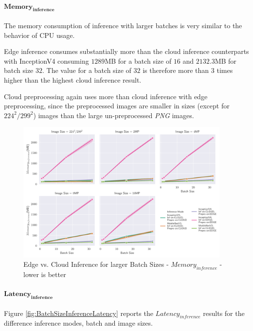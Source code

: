 \paragraph{$\mathbf{Memory_{inference}}$}
The memory consumption of inference with larger batches is very similar to the behavior of CPU usage.


Edge inference consumes substantially more than the cloud inference counterparts with InceptionV4 consuming $1289$MB for a batch size of $16$ and $2132.3$MB for batch size $32$.
The value for a batch size of $32$ is therefore more than $3$ times higher than the highest cloud inference result.

Cloud preprocessing again uses more than cloud inference with edge preprocessing, since the preprocessed images are smaller in sizes (except for $224^2/299^2$) images than the large un-preprocessed \emph{PNG} images.




\begin{figure}[!htb]
\centering
\includegraphics[width=0.95\textwidth]{./Bilder/single_plots/batch_size_plots/Effects_of_Batch_size_Inference_Memory.pdf}
\caption{Edge vs. Cloud Inference for larger Batch Sizes -  $Memory_{inference}$ - lower is better}
\label{fig:BatchSizeInferenceMemory}
\end{figure}


\paragraph{$\mathbf{Latency_{inference}}$}
Figure \ref{fig:BatchSizeInferenceLatency} reports the $Latency_{inference}$ results for the difference inference modes, batch and image sizes.

